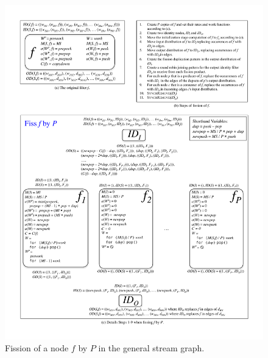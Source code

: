 \begin{figure}
\centering
\includegraphics[width=\textwidth]{figures/general-fission.pdf}
\caption[Fission of a node in the general stream graph.]{Fission of a
  node $f$ by $P$ in the general stream
  graph.\label{fig:general-fission}}
\end{figure}




